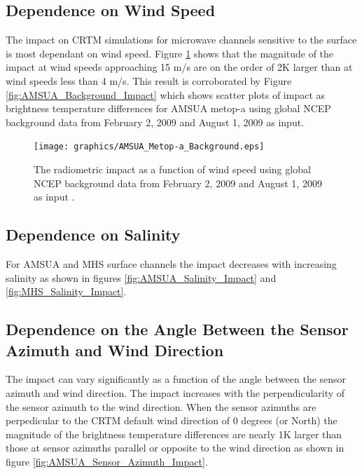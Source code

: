 \subsection{Dependence on Wind Speed}
The impact on CRTM simulations for microwave channels sensitive to the surface is most dependant on wind speed.  Figure \ref{fig:AMSUA_Wind_Speed_Impact} shows that the magnitude of the impact at wind speeds approaching 15 m/s are on the order of 2K larger than at wind speeds less than 4 m/s.  This result is corroborated by Figure \ref{fig:AMSUA_Background_Impact} which shows scatter plots of impact as brightness temperature differences for AMSUA metop-a using global NCEP background data from February 2, 2009 and August 1, 2009 as input.  

\begin{figure}[htp]
  \centering
  \texttt{[image: graphics/AMSUA\_Metop-a\_Background.eps]}
  \caption{The radiometric impact as a function of wind speed using global NCEP background data from February 2, 2009 and August 1, 2009 as input .}
  \label{fig:AMSUA_Wind_Speed_Impact}
\end{figure}

\subsection{Dependence on Salinity}
For AMSUA and MHS surface channels the impact decreases with increasing salinity as shown in figures \ref{fig:AMSUA_Salinity_Impact} and \ref{fig:MHS_Salinity_Impact}.  

\subsection{Dependence on the Angle Between the Sensor Azimuth and Wind Direction} 
The impact can vary significantly as a function of the angle between the sensor azimuth and wind direction.  The impact increases with the perpendicularity of the sensor azimuth to the wind direction.  When the sensor azimuths are perpedicular to the CRTM default wind direction of 0 degrees (or North) the magnitude of the brightness temperature differences are nearly 1K larger than those at sensor azimuths parallel or opposite to the wind direction as shown in figure \ref{fig:AMSUA_Sensor_Azimuth_Impact}.  
 





